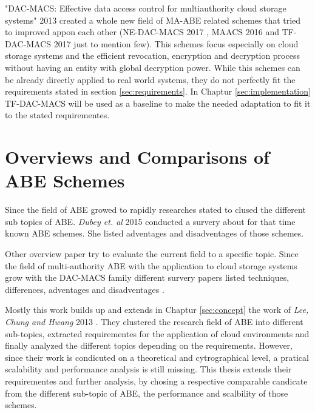 "DAC-MACS: Effective data access control for multiauthority cloud storage systems" 2013 \cite{yang2013dac} created a whole new field of MA-ABE related schemes that tried to improved appon each other (NE-DAC-MACS 2017 \cite{wu2017security}, MAACS 2016 \cite{li2016secure} and TF-DAC-MACS 2017 \cite{li2017two} just to mention few). This schemes focus especially on cloud storage systems and the efficient revocation, encryption and decryption process without having an entity with global decryption power. While this schemes can be already directly applied to real world systems, they do not perfectly fit the requirements stated in section \ref{sec:requirements}. In Chaptur \ref{sec:implementation} TF-DAC-MACS will be used as a baseline to make the needed adaptation to fit it to the stated requirementes. 

\section{Overviews and Comparisons of ABE Schemes}
Since the field of ABE growed to rapidly researches stated to clused the different sub topics of ABE. \textit{Dubey et. al} 2015 \cite{dubeysurvey} conducted a survery about for that time known ABE schemes. She listed adventages and disadventages of those schemes. 

Other overview paper try to evaluate the current field to a specific topic. Since the field of multi-authority ABE with the application to cloud storage systems grow with the DAC-MACS family different survery papers listed techniques, differences, adventages and disadventages \cite{nagarajan2018overview}. 

Mostly this work builds up and extends in Chaptur \ref{sec:concept} the work of \textit{Lee, Chung and Hwang} 2013 \cite{lee2013survey}. They clustered the research field of ABE into different sub-topics, extracted requirementes for the application of cloud environments and finally analyzed the different topics depending on the requirements. However, since their work is condicuted on a theoretical and cytrographical level, a pratical scalability and performance analysis is still missing. This thesis  extends their requirementes and further analysis, by chosing a respective comparable candicate from the different sub-topic of ABE, the performance and scalbility of those schemes. 

